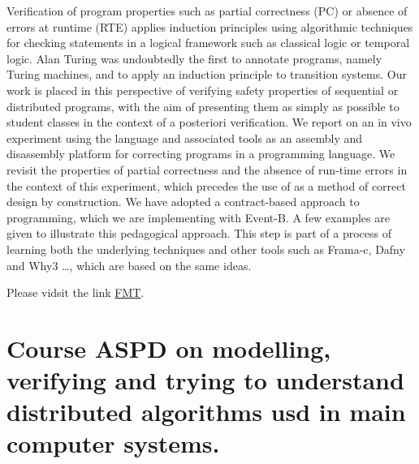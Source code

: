 \documentclass[ 12pt]{article}
\begin{document}
Verification of program properties such as partial correctness (PC) or absence of errors at runtime (RTE) applies induction principles using algorithmic techniques for checking statements in a logical framework such as classical logic or temporal logic.  Alan Turing was undoubtedly the first to annotate programs, namely Turing machines, and to apply an induction principle to transition systems.  Our work is placed in this perspective of verifying safety properties of sequential or distributed programs, with the aim of presenting them as simply as possible to student classes in the context of a posteriori verification.  We report on an in vivo experiment using the \eb language and associated tools as an assembly and disassembly platform for correcting programs in a programming language.  We revisit the properties of partial correctness and the absence of run-time errors in the context of this experiment, which precedes the use of \eb as a method of correct design by construction.  We have adopted a contract-based approach to programming, which we are implementing with Event-B.  A few examples are given to illustrate this pedagogical approach.  This step is part of a process of learning both the underlying techniques and other tools such as Frama-c, Dafny and Why3 \ldots, which are based on the same ideas.

Please vidsit the link \href{https://mery54.github.io/fmt}{FMT}.

\section{Course ASPD on modelling, verifying and trying to understand distributed algorithms usd in  main  computer systems. }
\end{document}
